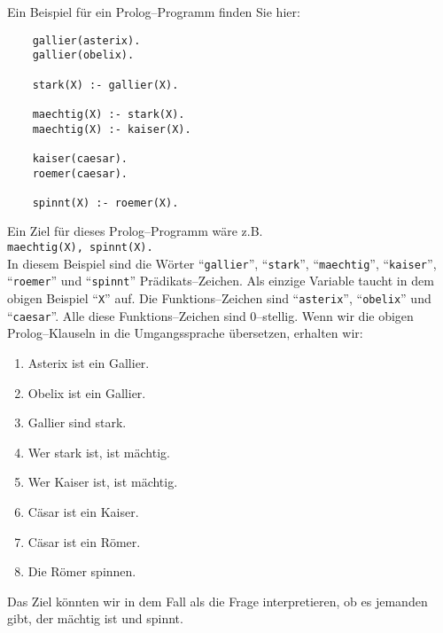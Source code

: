 Ein Beispiel f\"{u}r ein Prolog--Programm finden Sie hier:
\begin{verbatim}
    gallier(asterix).
    gallier(obelix).

    stark(X) :- gallier(X).

    maechtig(X) :- stark(X).
    maechtig(X) :- kaiser(X).

    kaiser(caesar).
    roemer(caesar).

    spinnt(X) :- roemer(X).
\end{verbatim}
Ein Ziel f\"{u}r dieses Prolog--Programm w\"{a}re z.B.\\[0.1cm]
\hspace*{1.3cm} \texttt{maechtig(X), spinnt(X).} \\[0.1cm]
In diesem Beispiel sind die W\"{o}rter ``\texttt{gallier}'', ``\texttt{stark}'',
``\texttt{maechtig}'', ``\texttt{kaiser}'', ``\texttt{roemer}'' und ``\texttt{spinnt}''
Pr\"{a}dikats--Zeichen.
Als einzige Variable taucht in dem obigen Beispiel ``\texttt{X}'' auf.  Die
Funktions--Zeichen sind 
``\texttt{asterix}'', ``\texttt{obelix}'' und ``\texttt{caesar}''.
Alle diese Funktions--Zeichen sind 0--stellig.
Wenn wir die obigen Prolog--Klauseln in die Umgangssprache \"{u}bersetzen, erhalten wir:
\begin{enumerate}
\item Asterix ist ein Gallier.
\item Obelix ist ein Gallier.
\item Gallier sind stark.
\item Wer stark ist, ist m\"{a}chtig.
\item Wer Kaiser ist, ist m\"{a}chtig.
\item C\"{a}sar ist ein Kaiser.
\item C\"{a}sar ist ein R\"{o}mer.
\item Die R\"{o}mer spinnen. 
\end{enumerate}
Das Ziel k\"{o}nnten wir in dem Fall als die Frage interpretieren, ob es jemanden gibt, der
m\"{a}chtig ist und spinnt.

